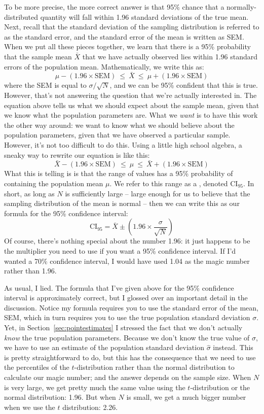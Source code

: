 To be more precise, the more correct answer is that 95\% chance that a normally-distributed quantity will fall within 1.96 standard deviations of the true mean. Next, recall that the standard deviation of the sampling distribution is referred to as the standard error, and the standard error of the mean is written as SEM. When we put all these pieces together, we learn that there is a 95\% probability that the sample mean $\bar{X}$ that we have actually observed lies within 1.96 standard errors of the population mean. Mathematically, we write this as:
$$
\mu - \left( 1.96 \times \mbox{SEM} \right) \ \leq \  \bar{X}\  \leq \  \mu + \left( 1.96 \times \mbox{SEM} \right) 
$$
where the SEM is equal to $\sigma / \sqrt{N}$, and we can be 95\% confident that this is true. However, that's not answering the question that we're actually interested in. The equation above tells us what we should expect about the sample mean, given that we know what the population parameters are. What we {\it want} is to have this work the other way around: we want to know what we should believe about the population parameters, given that we have observed a particular sample. However, it's not too difficult to do this. Using a little high school algebra, a sneaky way to rewrite our equation is like this:
$$
\bar{X} -  \left( 1.96 \times \mbox{SEM} \right) \ \leq \ \mu  \ \leq  \ \bar{X} +  \left( 1.96 \times \mbox{SEM}\right)
$$
What this is telling is is that the range of values has a 95\% probability of containing the population mean $\mu$. We refer to this range as a , denoted $\mbox{CI}_{95}$. In short, as long as $N$ is sufficiently large  -- large enough for us to believe that the sampling distribution of the mean is normal -- then we can write this as our formula for the 95\% confidence interval:
$$
\mbox{CI}_{95} = \bar{X} \pm \left( 1.96 \times \frac{\sigma}{\sqrt{N}} \right)
$$
Of course, there's nothing special about the number 1.96: it just happens to be the multiplier you need to use if you want a 95\% confidence interval. If I'd wanted a 70\% confidence interval, I would have used 1.04 as the magic number rather than 1.96.


As usual, I lied. The formula that I've given above for the 95\% confidence interval is approximately correct, but I glossed over an important detail in the discussion. Notice my formula requires you to use the standard error of the mean, SEM, which in turn requires you to use the true population standard deviation $\sigma$. Yet, in Section~\ref{sec:pointestimates} I stressed the fact that we don't actually {\it know} the true population parameters. Because we don't know the true value of $\sigma$, we have to use an estimate of the population standard deviation $\hat{\sigma}$ instead. This is pretty straightforward to do, but this has the consequence that we need to use the percentiles of the $t$-distribution rather than the normal distribution to calculate our magic number; and the answer depends on the sample size. When $N$ is very large, we get pretty much the same value using the $t$-distribution or the normal distribution: 1.96. But when $N$ is small, we get a much bigger number when we use the $t$ distribution: 2.26.

